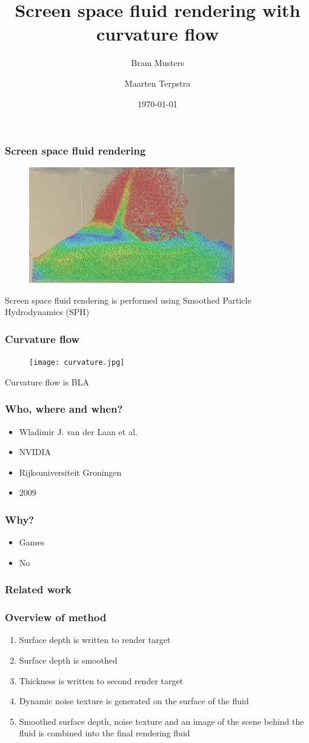 \documentclass{beamer}
\title[Fluid rendering with curvature flow] %
{Screen space fluid rendering with curvature flow}
\author[Musters, Terpstra] %
{Bram Musters \and Maarten Terpstra}
\date{\today}
\begin{document}
	\frame{\titlepage}
	\begin{frame}[t]\frametitle{Screen space fluid rendering}
		\begin{figure}
			\includegraphics[width=0.8\textwidth]{sph.jpg}
		\end{figure}
		Screen space fluid rendering is performed using Smoothed Particle Hydrodynamics (SPH) 
	\end{frame}
	\begin{frame}[t]\frametitle{Curvature flow}
		\begin{figure}
			\texttt{[image: curvature.jpg]}
		\end{figure}
		Curvature flow is BLA
	\end{frame}
	\begin{frame}[t]\frametitle{Who, where and when?}
	    \begin{itemize}
	    	\item Wladimir J. van der Laan et al.
	    	\item NVIDIA 
	    	\item Rijksuniversiteit Groningen
	    	\item 2009
	    \end{itemize}
	\end{frame}
	\begin{frame}[t]\frametitle{Why?}
		\begin{itemize}
			\item Games
			\item No
		\end{itemize}
	\end{frame}
	\begin{frame}[t]\frametitle{Related work}
			
	\end{frame}
	\begin{frame}[t]\frametitle{Overview of method}
	    \begin{enumerate}
	    	\item Surface depth is written to render target
	    	\item Surface depth is smoothed
	    	\item Thickness is written to second render target
	    	\item Dynamic noise texture is generated on the surface of the fluid
	    	\item Smoothed surface depth, noise texture and an image of the scene behind the fluid is combined into the final rendering fluid 
	    \end{enumerate}	
	\end{frame}
\end{document}
